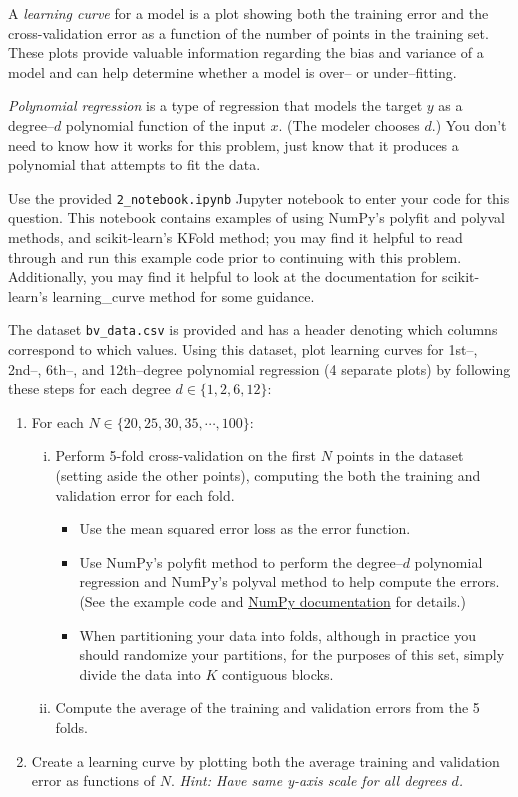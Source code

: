 A \emph{learning curve} for a model is a plot showing both the training error and the cross-validation error as a function of the number of points in the training set. These plots provide valuable information regarding the bias and variance of a model and can help determine whether a model is over-- or under--fitting.

\emph{Polynomial regression} is a type of regression that models the target $y$ as a degree--$d$ polynomial function of the input $x$. (The modeler chooses $d$.)  You don't need to know how it works for this problem, just know that it produces a polynomial that attempts to fit the data.

\begin{problem}[14]
    Use the provided \texttt{2_notebook.ipynb} Jupyter notebook to enter your code for this question. This notebook contains examples of using NumPy's polyfit and polyval methods, and scikit-learn's KFold method; you may find it helpful to read through and run this example code prior to continuing with this problem. Additionally, you may find it helpful to look at the documentation for scikit-learn's learning_curve method for some guidance.

The dataset \texttt{bv_data.csv} is provided and has a header denoting which columns correspond to which values. Using this dataset, plot learning curves for 1st--, 2nd--, 6th--, and 12th--degree polynomial regression (4 separate plots) by following these steps for each degree $d \in \{1, 2, 6, 12\}$:

  \begin{enumerate}
    \item For each $N \in \{20, 25, 30, 35, \cdots, 100\}$:
    \begin{enumerate}[i.]
      \item Perform 5-fold cross-validation on the first $N$ points in the dataset (setting aside the other points), computing the both the training and validation error for each fold. 
      \begin{itemize}
        \item Use the mean squared error loss as the error function.
        \item Use NumPy's polyfit method to perform the degree--$d$ polynomial regression and NumPy's polyval method to help compute the errors.  (See the example code and \href{https://docs.scipy.org/doc/NumPy/reference/routines.polynomials.poly1d.html}{NumPy documentation} for details.)
        \item When partitioning your data into folds, although in practice you should randomize your partitions, for the purposes of this set, simply divide the data into $K$ contiguous blocks.
      \end{itemize}
      \item Compute the average of the training and validation errors from the 5 folds.
    \end{enumerate}
    \item Create a learning curve by plotting both the average training and validation error as functions of $N$. \textit{Hint: Have same y-axis scale for all degrees $d$.}
  \end{enumerate}

\end{problem}
